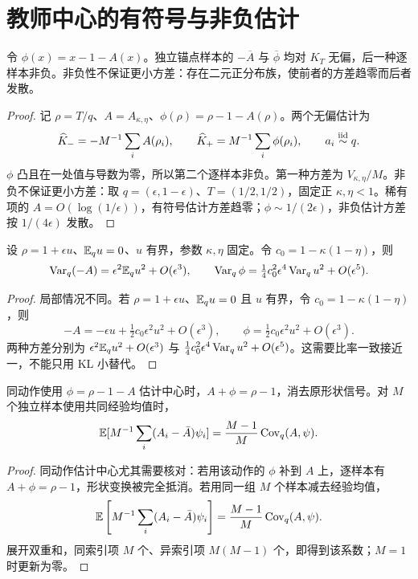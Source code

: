 \section{教师中心的有符号与非负估计}
\begin{proposition}[两种无偏教师中心估计及尾部反例]
令 $\phi(x)=x-1-A(x)$。独立锚点样本的 $-\overline A$ 与 $\overline\phi$ 均对 $K_T$ 无偏，后一种逐样本非负。非负性不保证更小方差：存在二元正分布族，使前者的方差趋零而后者发散。
\end{proposition}
\begin{proof}
记 $\rho=T/q$、$A=A_{\kappa,\eta}$、$\phi(\rho)=\rho-1-A(\rho)$。两个无偏估计为
\begin{equation}
\widehat K_-=-M^{-1}\sum_iA(\rho_i),\qquad
\widehat K_+=M^{-1}\sum_i\phi(\rho_i),\qquad a_i\overset{\rm iid}\sim q.
\end{equation}
$\phi$ 凸且在一处值与导数为零，所以第二个逐样本非负。第一种方差为 $V_{\kappa,\eta}/M$。非负不保证更小方差：取 $q=(\epsilon,1-\epsilon)$、$T=(1/2,1/2)$，固定正 $\kappa,\eta<1$。稀有项的 $A=O(\log(1/\epsilon))$，有符号估计方差趋零；$\phi\sim1/(2\epsilon)$，非负估计方差按 $1/(4\epsilon)$ 发散。
\end{proof}

\begin{proposition}[中心估计的局部方差阶数]
设 $\rho=1+\epsilon u$、$\mathbb E_qu=0$、$u$ 有界，参数 $\kappa,\eta$ 固定。令 $c_0=1-\kappa(1-\eta)$，则
\begin{equation}
\operatorname{Var}_q(-A)=\epsilon^2\mathbb E_qu^2+O(\epsilon^3),\qquad
\operatorname{Var}_q\phi=\tfrac14c_0^2\epsilon^4\operatorname{Var}_qu^2+O(\epsilon^5).
\end{equation}
\end{proposition}
\begin{proof}
局部情况不同。若 $\rho=1+\epsilon u$、$\mathbb E_qu=0$ 且 $u$ 有界，令 $c_0=1-\kappa(1-\eta)$，则
\begin{equation}
-A=-\epsilon u+\tfrac12c_0\epsilon^2u^2+O(\epsilon^3),\qquad
\phi=\tfrac12c_0\epsilon^2u^2+O(\epsilon^3).
\end{equation}
两种方差分别为 $\epsilon^2\mathbb E_qu^2+O(\epsilon^3)$ 与 $\frac14c_0^2\epsilon^4\operatorname{Var}_qu^2+O(\epsilon^5)$。这需要比率一致接近一，不能只用 KL 小替代。
\end{proof}

\begin{proposition}[同样本中心化的信号改变与倍率]
同动作使用 $\phi=\rho-1-A$ 估计中心时，$A+\phi=\rho-1$，消去原形状信号。对 $M$ 个独立样本使用共同经验均值时，
\begin{equation}
\mathbb E[M^{-1}\sum_i(A_i-\bar A)\psi_i]=\frac{M-1}{M}\operatorname{Cov}_q(A,\psi).
\end{equation}
\end{proposition}
\begin{proof}
同动作估计中心尤其需要核对：若用该动作的 $\phi$ 补到 $A$ 上，逐样本有 $A+\phi=\rho-1$，形状变换被完全抵消。若用同一组 $M$ 个样本减去经验均值，
\begin{equation}
\mathbb E\left[M^{-1}\sum_i(A_i-\bar A)\psi_i\right]
=\frac{M-1}{M}\operatorname{Cov}_q(A,\psi).
\end{equation}
展开双重和，同索引项 $M$ 个、异索引项 $M(M-1)$ 个，即得到该系数；$M=1$ 时更新为零。
\end{proof}

